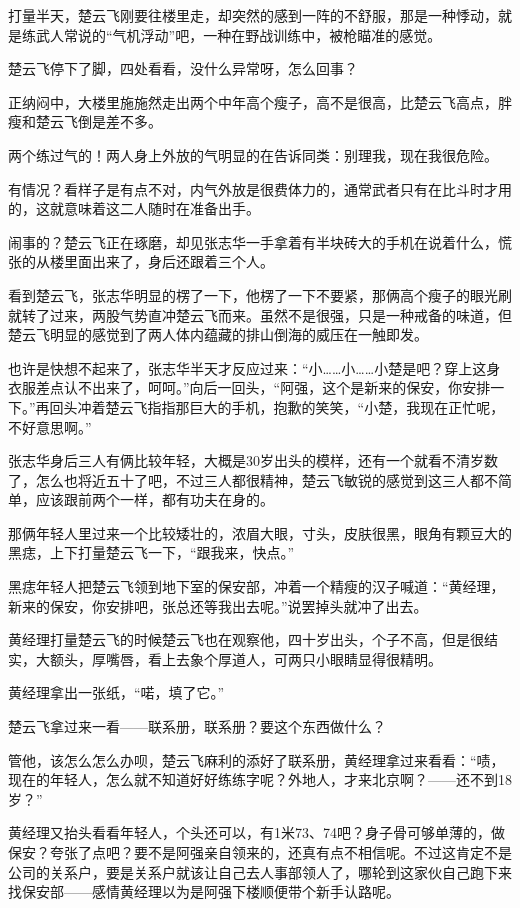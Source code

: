 打量半天，楚云飞刚要往楼里走，却突然的感到一阵的不舒服，那是一种悸动，就是练武人常说的“气机浮动”吧，一种在野战训练中，被枪瞄准的感觉。

楚云飞停下了脚，四处看看，没什么异常呀，怎么回事？

正纳闷中，大楼里施施然走出两个中年高个瘦子，高不是很高，比楚云飞高点，胖瘦和楚云飞倒是差不多。

两个练过气的！两人身上外放的气明显的在告诉同类：别理我，现在我很危险。

有情况？看样子是有点不对，内气外放是很费体力的，通常武者只有在比斗时才用的，这就意味着这二人随时在准备出手。

闹事的？楚云飞正在琢磨，却见张志华一手拿着有半块砖大的手机在说着什么，慌张的从楼里面出来了，身后还跟着三个人。

看到楚云飞，张志华明显的楞了一下，他楞了一下不要紧，那俩高个瘦子的眼光刷就转了过来，两股气势直冲楚云飞而来。虽然不是很强，只是一种戒备的味道，但楚云飞明显的感觉到了两人体内蕴藏的排山倒海的威压在一触即发。

也许是快想不起来了，张志华半天才反应过来：“小……小……小楚是吧？穿上这身衣服差点认不出来了，呵呵。”向后一回头，“阿强，这个是新来的保安，你安排一下。”再回头冲着楚云飞指指那巨大的手机，抱歉的笑笑，“小楚，我现在正忙呢，不好意思啊。”

张志华身后三人有俩比较年轻，大概是30岁出头的模样，还有一个就看不清岁数了，怎么也将近五十了吧，不过三人都很精神，楚云飞敏锐的感觉到这三人都不简单，应该跟前两个一样，都有功夫在身的。

那俩年轻人里过来一个比较矮壮的，浓眉大眼，寸头，皮肤很黑，眼角有颗豆大的黑痣，上下打量楚云飞一下，“跟我来，快点。”

黑痣年轻人把楚云飞领到地下室的保安部，冲着一个精瘦的汉子喊道：“黄经理，新来的保安，你安排吧，张总还等我出去呢。”说罢掉头就冲了出去。

黄经理打量楚云飞的时候楚云飞也在观察他，四十岁出头，个子不高，但是很结实，大额头，厚嘴唇，看上去象个厚道人，可两只小眼睛显得很精明。

黄经理拿出一张纸，“喏，填了它。”

楚云飞拿过来一看——联系册，联系册？要这个东西做什么？

管他，该怎么怎么办呗，楚云飞麻利的添好了联系册，黄经理拿过来看看：“啧，现在的年轻人，怎么就不知道好好练练字呢？外地人，才来北京啊？——还不到18岁？”

黄经理又抬头看看年轻人，个头还可以，有1米73、74吧？身子骨可够单薄的，做保安？夸张了点吧？要不是阿强亲自领来的，还真有点不相信呢。不过这肯定不是公司的关系户，要是关系户就该让自己去人事部领人了，哪轮到这家伙自己跑下来找保安部——感情黄经理以为是阿强下楼顺便带个新手认路呢。

